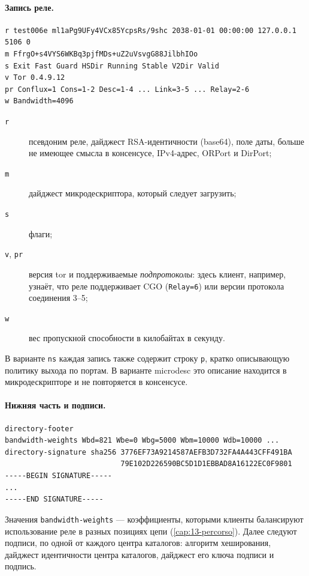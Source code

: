 \paragraph{Запись реле.}
\begin{lstlisting}[numbers=none]
r test006e ml1aPg9UFy4VCx85YcpsRs/9shc 2038-01-01 00:00:00 127.0.0.1 5106 0
m FfrgO+s4VYS6WKBq3pjfMDs+uZ2uVsvgG88JilbhIOo
s Exit Fast Guard HSDir Running Stable V2Dir Valid
v Tor 0.4.9.12
pr Conflux=1 Cons=1-2 Desc=1-4 ... Link=3-5 ... Relay=2-6
w Bandwidth=4096
\end{lstlisting}
\begin{description}
  \item[\texttt{r}] псевдоним реле, дайджест RSA-идентичности (base64), поле даты, больше не имеющее смысла в консенсусе, IPv4-адрес, ORPort и DirPort;
  \item[\texttt{m}] дайджест микродескриптора, который следует загрузить;
  \item[\texttt{s}] флаги;
  \item[\texttt{v}, \texttt{pr}] версия tor и поддерживаемые \emph{подпротоколы}: здесь клиент, например, узнаёт, что реле поддерживает CGO (\texttt{Relay=6}) или версии протокола соединения 3--5;
  \item[\texttt{w}] вес пропускной способности в килобайтах в секунду.
\end{description}
В варианте \texttt{ns} каждая запись также содержит строку \texttt{p}, кратко описывающую политику выхода по портам. В варианте microdesc это описание находится в микродескрипторе и не повторяется в консенсусе.

\paragraph{Нижняя часть и подписи.}
\begin{lstlisting}[numbers=none]
directory-footer
bandwidth-weights Wbd=821 Wbe=0 Wbg=5000 Wbm=10000 Wdb=10000 ...
directory-signature sha256 3776EF73A9214587AEFB3D732FA4A443CFF491BA
                           79E102D226590BC5D1D1EBBAD8A16122EC0F9801
-----BEGIN SIGNATURE-----
...
-----END SIGNATURE-----
\end{lstlisting}
Значения \texttt{bandwidth-weights} --- коэффициенты, которыми клиенты балансируют использование реле в разных позициях цепи (\cref{cap:13-percorso}). Далее следуют подписи, по одной от каждого центра каталогов: алгоритм хеширования, дайджест идентичности центра каталогов, дайджест его ключа подписи и подпись.

